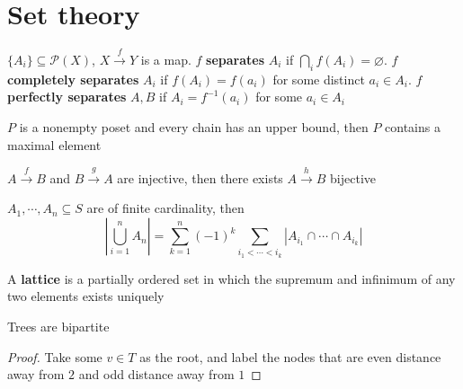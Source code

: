 \documentclass[main]{subfiles}
\begin{document}
\chapter{Set theory}
\tableofcontents

\begin{definition}
$\{A_i\}\subseteq \mathcal P(X)$, $X\xrightarrow f Y$ is a map. $f$ \textbf{separates} $A_i$ if $\bigcap_{i}f(A_i)=\varnothing$. $f$ \textbf{completely separates} $A_i$ if $f(A_i)=f(a_i)$ for some distinct $a_i\in A_i$. $f$ \textbf{perfectly separates} $A,B$ if $A_i=f^{-1}(a_i)$ for some $a_i\in A_i$
\end{definition}

\begin{lemma}\label{Zorn's lemma}
$P$ is a nonempty poset and every chain has an upper bound, then $P$ contains a maximal element
\end{lemma}

\begin{theorem}
$A\xrightarrow fB$ and $B\xrightarrow gA$ are injective, then there exists $A\xrightarrow hB$ bijective
\end{theorem}

\begin{theorem}\label{Inclusion-exclusion principle}
$A_1,\cdots,A_n\subseteq S$ are of finite cardinality, then
\[\left|\bigcup_{i=1}^nA_n\right|=\sum_{k=1}^n(-1)^k\sum_{i_1<\cdots<i_k}\left|A_{i_1}\cap\cdots\cap A_{i_k}\right|\]
\end{theorem}

\begin{definition}
A \textbf{lattice} is a partially ordered set in which the supremum and infinimum of any two elements exists uniquely
\end{definition}

\begin{lemma}
Trees are bipartite
\end{lemma}

\begin{proof}
Take some $v\in T$ as the root, and label the nodes that are even distance away from $2$ and odd distance away from $1$
\end{proof}
\end{document}

